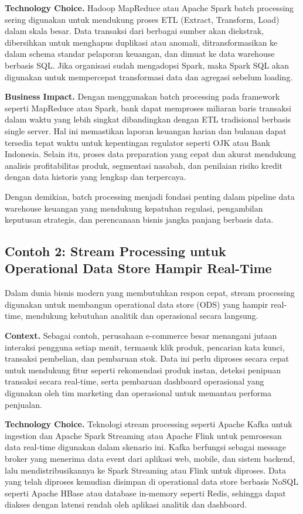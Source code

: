 \textbf{Technology Choice.} Hadoop MapReduce atau Apache Spark batch processing sering digunakan untuk mendukung proses ETL (Extract, Transform, Load) dalam skala besar. Data transaksi dari berbagai sumber akan diekstrak, dibersihkan untuk menghapus duplikasi atau anomali, ditransformasikan ke dalam schema standar pelaporan keuangan, dan dimuat ke data warehouse berbasis SQL. Jika organisasi sudah mengadopsi Spark, maka Spark SQL akan digunakan untuk mempercepat transformasi data dan agregasi sebelum loading.

\textbf{Business Impact.} Dengan menggunakan batch processing pada framework seperti MapReduce atau Spark, bank dapat memproses miliaran baris transaksi dalam waktu yang lebih singkat dibandingkan dengan ETL tradisional berbasis single server. Hal ini memastikan laporan keuangan harian dan bulanan dapat tersedia tepat waktu untuk kepentingan regulator seperti OJK atau Bank Indonesia. Selain itu, proses data preparation yang cepat dan akurat mendukung analisis profitabilitas produk, segmentasi nasabah, dan penilaian risiko kredit dengan data historis yang lengkap dan terpercaya.

Dengan demikian, batch processing menjadi fondasi penting dalam pipeline data warehouse keuangan yang mendukung kepatuhan regulasi, pengambilan keputusan strategis, dan perencanaan bisnis jangka panjang berbasis data.


\subsection{Contoh 2: Stream Processing untuk Operational Data Store Hampir Real-Time}


Dalam dunia bisnis modern yang membutuhkan respon cepat, stream processing digunakan untuk membangun operational data store (ODS) yang hampir real-time, mendukung kebutuhan analitik dan operasional secara langsung.

\textbf{Context.} Sebagai contoh, perusahaan e-commerce besar menangani jutaan interaksi pengguna setiap menit, termasuk klik produk, pencarian kata kunci, transaksi pembelian, dan pembaruan stok. Data ini perlu diproses secara cepat untuk mendukung fitur seperti rekomendasi produk instan, deteksi penipuan transaksi secara real-time, serta pembaruan dashboard operasional yang digunakan oleh tim marketing dan operasional untuk memantau performa penjualan.

\textbf{Technology Choice.} Teknologi stream processing seperti Apache Kafka untuk ingestion dan Apache Spark Streaming atau Apache Flink untuk pemrosesan data real-time digunakan dalam skenario ini. Kafka berfungsi sebagai message broker yang menerima data event dari aplikasi web, mobile, dan sistem backend, lalu mendistribusikannya ke Spark Streaming atau Flink untuk diproses. Data yang telah diproses kemudian disimpan di operational data store berbasis NoSQL seperti Apache HBase atau database in-memory seperti Redis, sehingga dapat diakses dengan latensi rendah oleh aplikasi analitik dan dashboard.

